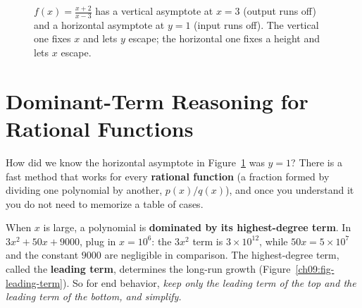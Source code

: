 \begin{figure}[htbp]
\centering
{}
\caption{$f(x)=\frac{x+2}{x-3}$ has a vertical asymptote at $x=3$ (output runs
off) and a horizontal asymptote at $y=1$ (input runs off). The vertical one
fixes $x$ and lets $y$ escape; the horizontal one fixes a height and lets $x$
escape.}
\label{ch09:fig-rational}
\end{figure}

\section{Dominant-Term Reasoning for Rational Functions}
\label{ch09:dominant}

How did we know the horizontal asymptote in Figure~\ref{ch09:fig-rational} was
$y=1$? There is a fast method that works for every \textbf{rational
function} (a fraction formed by dividing one polynomial by another,
$p(x)/q(x)$), and once you understand it you do not need to memorize a table
of cases.

\begin{intuitionbox}
When $x$ is large, a polynomial is \textbf{dominated by its highest-degree term}.
In $3x^2 + 50x + 9000$, plug in $x=10^6$: the $3x^2$ term is $3\times 10^{12}$,
while $50x = 5\times 10^7$ and the constant $9000$ are negligible in
comparison. The highest-degree term, called the \textbf{leading term},
determines the long-run growth (Figure~\ref{ch09:fig-leading-term}). So for end
behavior, \emph{keep only the leading term of the top and the leading term of
the bottom, and simplify.}
\end{intuitionbox}

